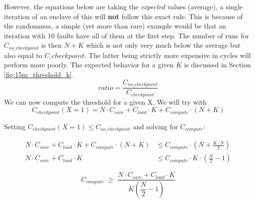 \documentclass[11pt,a4paper]{report}
\begin{document}
However, the equations below are taking the \textit{expected} values (average), a single iteration of an enclave of this will \textbf{not} follow this exact rule.
This is because of the randomness, a simple (yet more than rare) example would be that an iteration with 10 faults have all of them at the first step.
The number of runs for $C_{no\_checkpoint}$ is then $N+K$ which is not only very much below the average but also equal to $C\_{checkpoint}$.
The latter being strictly more expensive in cycles will perform more poorly.
The expected behavior for a given $K$ is discussed in Section \ref{fig:15m_threshold_k}.
\begin{equation}
ratio = \frac{C_{no\_checkpoint}}{C_{checkpoint}}
\end{equation}
We can now compute the threshold for a given X, We will try with 
\begin{equation}
C_{checkpoint}(X{=}1) = N \cdot C_{save} + C_{load}\cdot K + C_{compute}\cdot (N + K)
\label{eq:checkpoint_cost_X1}
\end{equation}

\noindent Setting $C_{checkpoint}(X{=}1) \le C_{no\_checkpoint}$ and solving for $C_{compute}$:

\begin{align}
N \cdot C_{save} + C_{load}\cdot K + C_{compute}\cdot (N + K)
&\le C_{compute}\cdot\left(N + \frac{K \cdot N}{2}\right) \\
N \cdot C_{save} + C_{load}\cdot K
&\le C_{compute}\cdot K \cdot\left(\frac{N}{2} - 1\right)
\end{align}

\begin{equation}
\boxed{C_{compute} \;\ge\; \dfrac{N \cdot C_{save} + C_{load}\cdot K}{K\left(\dfrac{N}{2} - 1\right)}}
\label{eq:compute_threshold_X1}
\end{equation}
\end{document}
